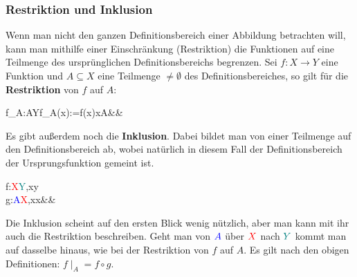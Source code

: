 \documentclass[12pt]{article}
\begin{document}
		\subsubsection{Restriktion und Inklusion}
			Wenn man nicht den ganzen Definitionsbereich einer Abbildung betrachten will, kann man mithilfe einer Einschränkung (Restriktion) die Funktionen auf eine Teilmenge des ursprünglichen Definitionsbereichs begrenzen. Sei $f:X\to Y$ eine Funktion und $A\subseteq X$ eine Teilmenge $\neq\emptyset$ des Definitionsbereiches, so gilt für die \textbf{Restriktion} von $f$ auf $A$:
			\begin{flalign*}
				f\mid_A:A\to Yf\mid_A(x):=f(x)x\in A&&
			\end{flalign*}
			Es gibt außerdem noch die \textbf{Inklusion}. Dabei bildet man von einer Teilmenge auf den Definitionsbereich ab, wobei natürlich in diesem Fall der Definitionsbereich der Ursprungsfunktion gemeint ist.
			\begin{flalign*}
				f:\textcolor{red}{X}\to \textcolor{teal}{Y},x\mapsto y\\
				g:\textcolor{blue}{A}\to \textcolor{red}{X},x\mapsto x&&
			\end{flalign*}
			Die Inklusion scheint auf den ersten Blick wenig nützlich, aber man kann mit ihr auch die Restriktion beschreiben. Geht man von $\textcolor{blue}{A}$ über $\textcolor{red}{X}$ nach $\textcolor{teal}{Y}$ kommt man auf dasselbe hinaus, wie bei der Restriktion von $f$ auf $A$. Es gilt nach den obigen Definitionen: $f\mid_A=f\circ g$.
\end{document}
